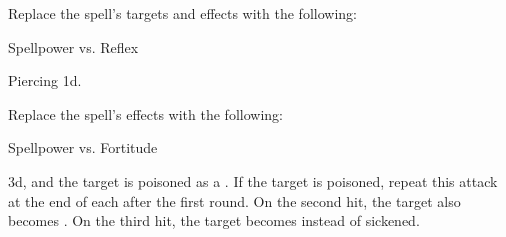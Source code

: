 


Replace the spell's targets and effects with the following:
\begin{spellcontent}

\begin{augmenttargetinginfo}




\end{augmenttargetinginfo}


\begin{augmenteffects}




\begin{spellattack}{Spellpower vs. Reflex}


\hit Piercing  \plus1d.


\end{spellattack}



\end{augmenteffects}

\end{spellcontent}








Replace the spell's effects with the following:
\begin{spellcontent}

\begin{augmenteffects}




\begin{spellattack}{Spellpower vs. Fortitude}


\hit
{} \minus3d, and the target is poisoned as a .
If the target is poisoned, repeat this attack at the end of each  after the first round.
On the second hit, the target also becomes .
On the third hit, the target becomes  instead of sickened.



\end{spellattack}





\end{augmenteffects}

\end{spellcontent}





